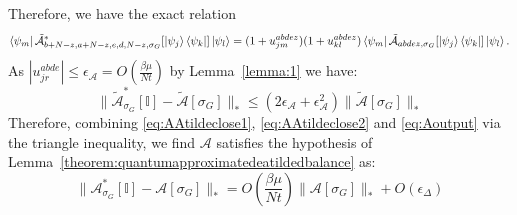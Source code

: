 Therefore, we have the exact relation
\begin{equation}
  \bra{\psi_m}\tilde{\mathcal{A}}^*_{b+N-z,a+N-z,e,d,N-z,\sigma_G}[\ket{\psi_j}\bra{\psi_k}]\ket{\psi_l} 
   =(1+u_{jm}^{abdez})(1+u_{kl}^{abdez})\bra{\psi_m}\tilde{\mathcal{A}}_{abdez,\sigma_G}[\ket{\psi_j}\bra{\psi_k}]\ket{\psi_l}.
\end{equation}
As $|u_{jr}^{abde}| \leq \epsilon_{\mathcal{A}} = O(\frac{\beta \mu}{Nt})$ by Lemma~\ref{lemma:1}  we have:
\begin{equation}
    \|\tilde{\mathcal{A}}^*_{\sigma_G}[\mathbb{I}] - \tilde{\mathcal{A}}[\sigma_G]\|_* \leq (2\epsilon_{\mathcal{A}}+ \epsilon_{\mathcal{A}}^2)\|\tilde{\mathcal{A}}[\sigma_G]\|_*
    \label{eq:Aoutput}
\end{equation}
Therefore, combining \eqref{eq:AAtildeclose1}, \eqref{eq:AAtildeclose2} and \eqref{eq:Aoutput} via the triangle inequality, we find $\mathcal{A}$ satisfies the hypothesis of Lemma~\ref{theorem:quantumapproximatedeatildedbalance} as:
\begin{equation}
    \|\mathcal{A}^*_{\sigma_G}[\mathbb{I}] - \mathcal{A}[\sigma_G]\|_* = O\!\left(\frac{\beta\mu}{Nt}\right)\|\mathcal{A}[\sigma_G]\|_* + O\!\left(\epsilon_{\Delta}\right)
\end{equation}
